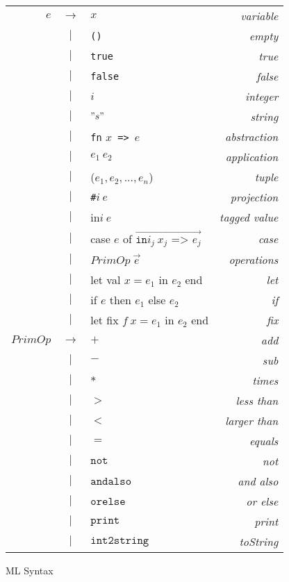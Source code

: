 \documentclass{article}
\theoremstyle{definition}
\theoremstyle{remark}
\numberwithin{equation}{section}
\begin{document}
\begin{figure}[!ht]
  \centering
\begin{tabular}{rclr}
$e$ & $\to$ & $x$ & \emph{variable}\\
     & $|$   & \texttt{()} & \emph{empty}\\
     & $|$   & \texttt{true} & \emph{true}\\
     & $|$   & \texttt{false} & \emph{false}\\
     & $|$   & $i$ & \emph{integer}\\
     & $|$   & $"s"$ & \emph{string}\\
     &  $|$  & \texttt{fn} $x$\texttt{ => }$e$ & \emph{abstraction}\\
     &  $|$  & $e_1\ e_2$ & \emph{application}\\
     &  $|$  & ($e_1,e_2, ..., e_n$) & \emph{tuple}\\
     &  $|$  & \texttt{\#}$i\ e$  & \emph{projection}\\
     &  $|$  & \textsf{in}$i\ e$  & \emph{tagged value}\\
     &  $|$  & \textsf{case }$e$ \textsf{of }
            $\overrightarrow{\texttt{in}i_j\ x_j\texttt{ => } e_j}$ & \emph{case}\\
     &  $|$  & $PrimOp\ \vec{e}$ & \emph{operations}\\
     &  $|$  & \textsf{let val }$x=e_1$\textsf{ in }$e_2$\textsf{ end}
         & \emph{let}\\
     &  $|$  & \textsf{if }$e$\textsf{ then }$e_1$\textsf{ else }$e_2$
         & \emph{if}\\
     &  $|$  & \textsf{let fix }$f\ x=e_1$\textsf{ in }$e_2$\textsf{ end}
         & \emph{fix}\\
$PrimOp$ & $\to$ & $+$ & \emph{add}\\
     & $|$ & $-$ & \emph{sub}\\
     & $|$ & $*$ & \emph{times}\\
     & $|$ & $>$ & \emph{less than}\\
     & $|$ & $<$ & \emph{larger than}\\
     & $|$ & $=$ & \emph{equals}\\
     & $|$ & $\texttt{not}$ & \emph{not}\\
     & $|$ & $\texttt{andalso}$ & \emph{and also}\\
     & $|$ & $\texttt{orelse}$ & \emph{or else}\\
     & $|$ & $\texttt{print}$ & \emph{print}\\
     & $|$ & $\texttt{int2string}$ & \emph{toString}\\

\end{tabular}
  \caption{ML Syntax}
  \label{fig-sub}
\end{figure}
\end{document}
